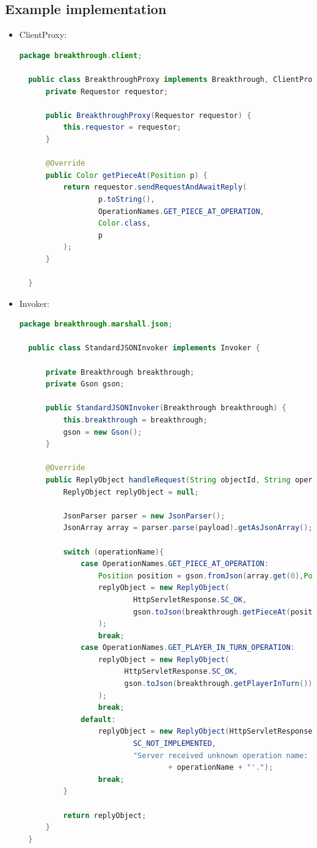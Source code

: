 \documentclass[a4, english]{article}
\begin{document}
\subsection{Example implementation}
\begin{itemize}
	\item ClientProxy:
  \begin{lstlisting}[language=java]
  package breakthrough.client;

  public class BreakthroughProxy implements Breakthrough, ClientProxy {
      private Requestor requestor;

      public BreakthroughProxy(Requestor requestor) {
          this.requestor = requestor;
      }

      @Override
      public Color getPieceAt(Position p) {
          return requestor.sendRequestAndAwaitReply(
                  p.toString(),
                  OperationNames.GET_PIECE_AT_OPERATION,
                  Color.class,
                  p
          );
      }

  }
  \end{lstlisting}
  \item Invoker:
  \begin{lstlisting}[language=java]
  package breakthrough.marshall.json;

  public class StandardJSONInvoker implements Invoker {

      private Breakthrough breakthrough;
      private Gson gson;

      public StandardJSONInvoker(Breakthrough breakthrough) {
          this.breakthrough = breakthrough;
          gson = new Gson();
      }

      @Override
      public ReplyObject handleRequest(String objectId, String operationName, String payload) {
          ReplyObject replyObject = null;

          JsonParser parser = new JsonParser();
          JsonArray array = parser.parse(payload).getAsJsonArray();

          switch (operationName){
              case OperationNames.GET_PIECE_AT_OPERATION:
                  Position position = gson.fromJson(array.get(0),Position.class);
                  replyObject = new ReplyObject(
                          HttpServletResponse.SC_OK,
                          gson.toJson(breakthrough.getPieceAt(position))
                  );
                  break;
              case OperationNames.GET_PLAYER_IN_TURN_OPERATION:
                  replyObject = new ReplyObject(
                        HttpServletResponse.SC_OK,
                        gson.toJson(breakthrough.getPlayerInTurn())
                  );
                  break;
              default:
                  replyObject = new ReplyObject(HttpServletResponse.
                          SC_NOT_IMPLEMENTED,
                          "Server received unknown operation name: '"
                                  + operationName + "'.");
                  break;
          }

          return replyObject;
      }
  }
  \end{lstlisting}
\end{itemize} 
\newpage
\end{document}
